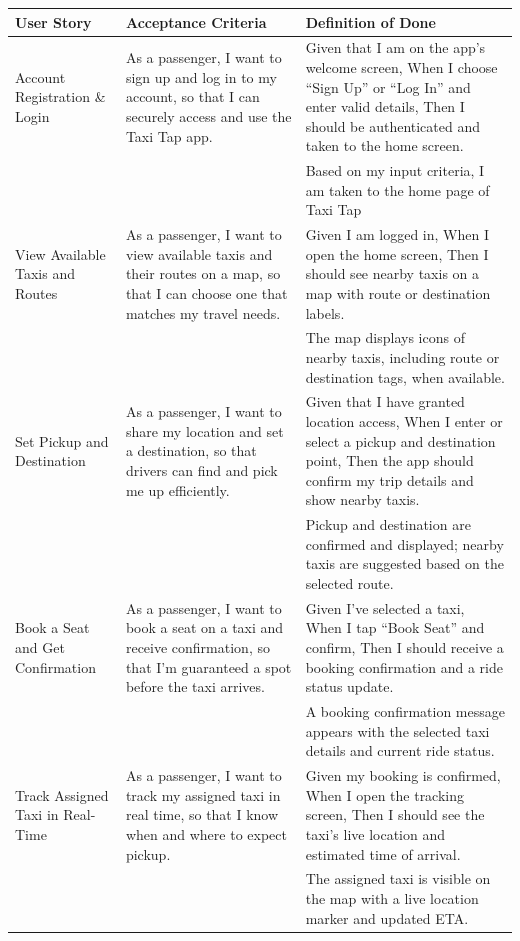 \documentclass[a4paper,12pt]{article}
\begin{document}
\begin{longtable}{>{\raggedright}p{4cm} p{6cm} p{5cm}}
\toprule
\textbf{User Story} & \textbf{Acceptance Criteria} & \textbf{Definition of Done} \\
\midrule
Account Registration \& Login & As a passenger, I want to sign up and log in to my account, so that I can securely access and use the Taxi Tap app. & Given that I am on the app’s welcome screen, When I choose “Sign Up” or “Log In” and enter valid details, Then I should be authenticated and taken to the home screen. \\
& & Based on my input criteria, I am taken to the home page of Taxi Tap \\ \midrule
View Available Taxis and Routes & As a passenger, I want to view available taxis and their routes on a map, so that I can choose one that matches my travel needs. & Given I am logged in, When I open the home screen, Then I should see nearby taxis on a map with route or destination labels. \\
& & The map displays icons of nearby taxis, including route or destination tags, when available. \\ \midrule
Set Pickup and Destination & As a passenger, I want to share my location and set a destination, so that drivers can find and pick me up efficiently. & Given that I have granted location access, When I enter or select a pickup and destination point, Then the app should confirm my trip details and show nearby taxis. \\
& & Pickup and destination are confirmed and displayed; nearby taxis are suggested based on the selected route. \\ \midrule
Book a Seat and Get Confirmation & As a passenger, I want to book a seat on a taxi and receive confirmation, so that I’m guaranteed a spot before the taxi arrives. & Given I’ve selected a taxi, When I tap “Book Seat” and confirm, Then I should receive a booking confirmation and a ride status update. \\
& & A booking confirmation message appears with the selected taxi details and current ride status. \\ \midrule
Track Assigned Taxi in Real-Time & As a passenger, I want to track my assigned taxi in real time, so that I know when and where to expect pickup. & Given my booking is confirmed, When I open the tracking screen, Then I should see the taxi’s live location and estimated time of arrival. \\
& & The assigned taxi is visible on the map with a live location marker and updated ETA. \\ \midrule

\end{longtable}
\end{document}
